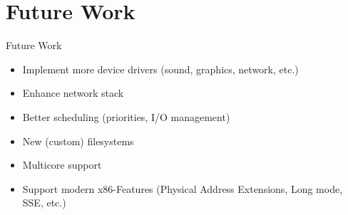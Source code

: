 \section{Future Work}

\begin{frame}{Future Work}
	\begin{itemize}
		\setlength\itemsep{1em}
		\item Implement more device drivers (sound, graphics, network, etc.)
		\item Enhance network stack
		\item Better scheduling (priorities, I/O management)
		\item New (custom) filesystems
		\item Multicore support
		\item Support modern x86-Features (Physical Address Extensions, Long mode, SSE, etc.)
	\end{itemize}	
\end{frame}